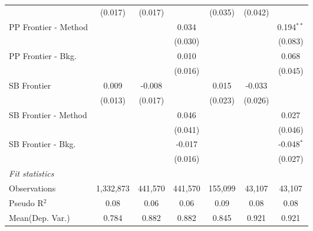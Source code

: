 \begin{tabular}{lcccccc}
                        & (0.017)      & (0.017) &         & (0.035)       & (0.042)       &   \\   
   PP Frontier - Method &              &         & 0.034   &               &               & 0.194$^{**}$\\   
                        &              &         & (0.030) &               &               & (0.083)\\   
   PP Frontier - Bkg.   &              &         & 0.010   &               &               & 0.068\\   
                        &              &         & (0.016) &               &               & (0.045)\\   
   SB Frontier          & 0.009        & -0.008  &         & 0.015         & -0.033        &   \\   
                        & (0.013)      & (0.017) &         & (0.023)       & (0.026)       &   \\   
   SB Frontier - Method &              &         & 0.046   &               &               & 0.027\\   
                        &              &         & (0.041) &               &               & (0.046)\\   
   SB Frontier - Bkg.   &              &         & -0.017  &               &               & -0.048$^{*}$\\   
                        &              &         & (0.016) &               &               & (0.027)\\   
   \midrule
   \emph{Fit statistics}\\
   Observations         & 1,332,873    & 441,570 & 441,570 & 155,099       & 43,107        & 43,107\\  
   Pseudo R$^2$         & 0.08         & 0.06    & 0.06    & 0.09          & 0.08          & 0.08\\  
Mean(Dep. Var.) & 0.784 & 0.882 & 0.882 & 0.845 & 0.921 & 0.921 \\
   

\end{tabular}
